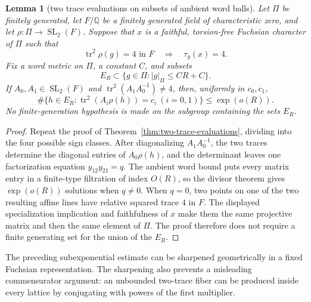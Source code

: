 \documentclass[11pt,reqno]{amsart}
\newtheorem{lemma}[theorem]{Lemma}
\theoremstyle{definition}
\theoremstyle{remark}
\newcommand{\Q}{\mathbb Q}
\newcommand{\Tr}{\operatorname{tr}}
\newcommand{\SL}{\operatorname{SL}}
\begin{document}
\begin{lemma}[two trace evaluations on subsets of ambient word balls]
\label{lem:ambient-two-trace-evaluations}
Let \(\Pi\) be finitely generated, let \(F/\Q\) be a finitely generated
field of characteristic zero, and let
\(\rho\colon\Pi\to\SL_2(F)\).  Suppose that \(x\) is a faithful,
torsion-free Fuchsian character of \(\Pi\) such that
\[
 \Tr^2\rho(g)=4\text{ in }F\quad\Longrightarrow\quad \tau_g(x)=4.
\]
Fix a word metric on \(\Pi\), a constant \(C\), and subsets
\[
 E_R\subset\{g\in\Pi:|g|_\Pi\le CR+C\}.
\]
If \(A_0,A_1\in\SL_2(F)\) and
\(\Tr^2(A_1A_0^{-1})\ne4\), then, uniformly in \(c_0,c_1\),
\[
 \#\{h\in E_R:\Tr^2(A_i\rho(h))=c_i\ (i=0,1)\}
   \le\exp(o(R)).
\]
No finite-generation hypothesis is made on the subgroup containing the
sets \(E_R\).
\end{lemma}

\begin{proof}
Repeat the proof of Theorem~\ref{thm:two-trace-evaluations}, dividing into
the four possible sign classes.  After diagonalizing
\(A_1A_0^{-1}\), the two traces determine the diagonal entries of
\(A_0\rho(h)\), and the determinant leaves one factorization equation
\(y_{12}y_{21}=q\).  The ambient word bound puts every matrix entry in a
finite-type filtration of index \(O(R)\), so the divisor theorem gives
\(\exp(o(R))\) solutions when \(q\ne0\).  When \(q=0\), two points on one
of the two resulting affine lines have relative squared trace \(4\) in
\(F\).  The displayed specialization implication and faithfulness of
\(x\) make them the same projective matrix and then the same element of
\(\Pi\).  The proof therefore does not require a finite generating set for
the union of the \(E_R\).
\end{proof}

The preceding subexponential estimate can be sharpened geometrically in a
fixed Fuchsian representation.  The sharpening also prevents a misleading
commensurator argument: an unbounded two-trace fiber can be produced inside
every lattice by conjugating with powers of the first multiplier.
\end{document}
